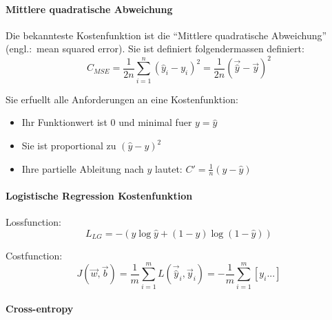 \documentclass[../main]{subfiles}
\begin{document}
\paragraph{Mittlere quadratische Abweichung}
Die bekannteste Kostenfunktion ist die ``Mittlere quadratische Abweichung''
(engl.:\ mean squared error).
Sie ist definiert folgendermassen definiert:
\begin{equation}
  C_{MSE} = \frac{1}{2n}\sum_{i=1}^{n}{(\hat{y}_i - y_i)}^2 = \frac{1}{2n}{(\vec{\hat{y}} - \vec{y})}^2
\end{equation}

Sie erfuellt alle Anforderungen an eine Kostenfunktion:
\begin{itemize}
\item{Ihr Funktionwert ist 0 und minimal fuer $y = \hat{y}$}
\item{Sie ist proportional zu ${(\hat{y}-y)}^2$}
\item{Ihre partielle Ableitung nach $y$ lautet: $C'=\frac{1}{n}(y-\hat{y})$}
\end{itemize}

\paragraph{Logistische Regression Kostenfunktion}

Lossfunction:
\begin{equation}
  L_{LG} = -(y \log \hat{y} + (1-y) \log (1-\hat{y}))
\end{equation}

Costfunction:
\begin{equation}
  J(\vec{w},\vec{b}) = \frac{1}{m} \sum_{i=1}^m L(\vec{\hat{y}}_i,\vec{y}_i) = - \frac{1}{m} \sum_{i=1}^m \left[ y_i...  \right]
\end{equation}



\paragraph{Cross-entropy}
\end{document}
